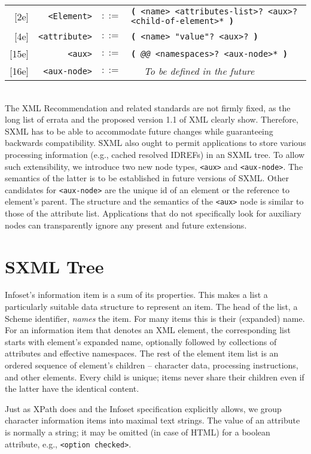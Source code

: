 \documentclass[10pt]{article}
\begin{document}
\begin{tabular}{rrcp{2.8in}}
{[}2e{]} & \texttt{<Element>} &  $::=$ & \texttt{\textbf{(} <name> <attributes-list>? <aux>? <child-of-element>* \textbf{)} } \\
{[}4e{]} & \texttt{<attribute>} &  $::=$ & \texttt{\textbf{(} <name> "value"? <aux>? \textbf{)} } \\
{[}15e{]} & \texttt{<aux>} &  $::=$ & \texttt{\textbf{(} {\itshape @@} <namespaces>? <aux-node>* \textbf{)} } \\
{[}16e{]} & \texttt{<aux-node>} &  $::=$ & \texttt{~ } \emph{To be defined in the future}\\
\end{tabular}
\\
The XML Recommendation and related standards are not firmly
fixed, as the long list of errata and the proposed version 1.1 of XML
clearly show. Therefore, SXML has to be able to accommodate future
changes while guaranteeing backwards compatibility. SXML also ought to
permit applications to store various processing information (e.g.,
cached resolved IDREFs) in an SXML tree. To allow such extensibility, we
introduce two new node types, \texttt{<aux>} and \texttt{<aux-node>}. The semantics of the latter is to be
established in future versions of SXML. Other candidates for \texttt{<aux-node>} are the unique id of an element or the reference to element's parent. The structure and the semantics of the \texttt{<aux>} node is similar to those of the attribute list. Applications that do not specifically look for auxiliary
nodes can transparently ignore any present and future extensions.

\section{SXML Tree}
Infoset's information item is a sum of its properties. This makes
a list a particularly suitable data structure to represent an
item. The head of the list, a Scheme identifier, \emph{names} the
item. For many items this is their (expanded) name. For an information
item that denotes an XML element, the corresponding list starts with
element's expanded name, optionally followed by collections of
attributes and effective namespaces. The rest of the element item list
is an ordered sequence of element's children -- character data,
processing instructions, and other elements. Every child is unique;
items never share their children even if the latter have the identical
content.

Just as XPath does and the Infoset specification explicitly allows,
we group character information items into maximal text strings.  The
value of an attribute is normally a string; it may be omitted (in
case of HTML) for a boolean attribute, e.g., \texttt{<option checked>}.
\end{document}
